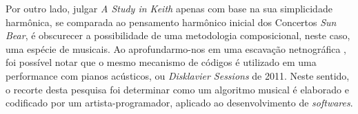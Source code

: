 Por outro lado, julgar \emph{A Study in Keith} apenas com base na sua simplicidade harmônica, se comparada ao pensamento harmônico inicial dos Concertos \emph{Sun Bear}, é obscurecer a possibilidade de uma metodologia composicional, neste caso, uma espécie de  musicais. Ao aprofundarmo-nos em uma escavação netnográfica \cite{mori_analysing_2015}, foi possível notar que o mesmo mecanismo de códigos é utilizado em uma performance com pianos acústicos, ou \emph{Disklavier Sessions} de 2011. Neste sentido, o recorte desta pesquisa foi determinar como um algoritmo musical é elaborado e codificado por um artista-programador, aplicado ao desenvolvimento de \emph{softwares}.


